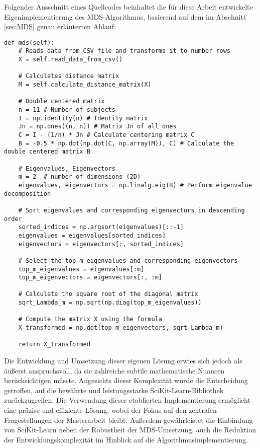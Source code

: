 \noindent
\begin{minipage}{\linewidth}
Folgender Ausschnitt eines Quellcodes beinhaltet die für diese
Arbeit entwickelte Eigenimplementierung des MDS-Algorithmus, basierend auf dem im Abschnitt
\ref{sec:MDS} genau erläuterten Ablauf:
\begin{lstlisting}[style=Python]
def mds(self):
    # Reads data from CSV file and transforms it to number rows
    X = self.read_data_from_csv()

    # Calculates distance matrix
    M = self.calculate_distance_matrix(X)

    # Double centered matrix
    n = 11 # Number of subjects
    I = np.identity(n) # Identity matrix
    Jn = np.ones((n, n)) # Matrix Jn of all ones
    C = I - (1/n) * Jn # Calculate centering matrix C
    B = -0.5 * np.dot(np.dot(C, np.array(M)), C) # Calculate the double centered matrix B

    # Eigenvalues, Eigenvectors
    m = 2  # number of dimensions (2D)
    eigenvalues, eigenvectors = np.linalg.eig(B) # Perform eigenvalue decomposition

    # Sort eigenvalues and corresponding eigenvectors in descending order
    sorted_indices = np.argsort(eigenvalues)[::-1]
    eigenvalues = eigenvalues[sorted_indices]
    eigenvectors = eigenvectors[:, sorted_indices]

    # Select the top m eigenvalues and corresponding eigenvectors
    top_m_eigenvalues = eigenvalues[:m]
    top_m_eigenvectors = eigenvectors[:, :m]

    # Calculate the square root of the diagonal matrix
    sqrt_Lambda_m = np.sqrt(np.diag(top_m_eigenvalues))

    # Compute the matrix X using the formula
    X_transformed = np.dot(top_m_eigenvectors, sqrt_Lambda_m)

    return X_transformed
\end{lstlisting}
\end{minipage}

Die Entwicklung und Umsetzung dieser eigenen Lösung erwies
sich jedoch als äußerst anspruchsvoll, da sie zahlreiche subtile mathematische
Nuancen berücksichtigen müsste. Angesichts dieser Komplexität wurde die
Entscheidung getroffen, auf die bewährte und leistungsstarke
SciKit-Learn-Bibliothek zurückzugreifen. Die Verwendung dieser etablierten
Implementierung ermöglicht eine präzise und effiziente Lösung, wobei der Fokus
auf den zentralen Fragestellungen der Masterarbeit bleibt. Außerdem gewährleistet
die Einbindung von SciKit-Learn neben der Robustheit der MDS-Umsetzung, auch die
Reduktion der Entwicklungskomplexität im Hinblick auf die
Algorithmusimplementierung. \parencite{developers_scikit-learn_2023}

